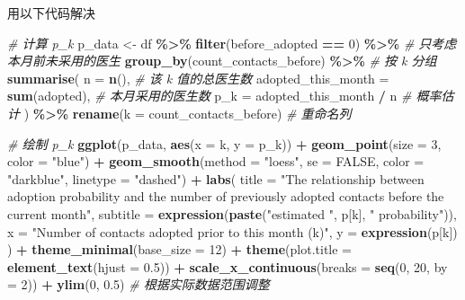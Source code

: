\documentclass[
]{article}
\newenvironment{Shaded}{\begin{snugshade}}{\end{snugshade}}
\newcommand{\AttributeTok}[1]{\textcolor[rgb]{0.13,0.29,0.53}{#1}}
\newcommand{\CommentTok}[1]{\textcolor[rgb]{0.56,0.35,0.01}{\textit{#1}}}
\newcommand{\ConstantTok}[1]{\textcolor[rgb]{0.56,0.35,0.01}{#1}}
\newcommand{\DecValTok}[1]{\textcolor[rgb]{0.00,0.00,0.81}{#1}}
\newcommand{\FloatTok}[1]{\textcolor[rgb]{0.00,0.00,0.81}{#1}}
\newcommand{\FunctionTok}[1]{\textcolor[rgb]{0.13,0.29,0.53}{\textbf{#1}}}
\newcommand{\NormalTok}[1]{#1}
\newcommand{\OtherTok}[1]{\textcolor[rgb]{0.56,0.35,0.01}{#1}}
\newcommand{\SpecialCharTok}[1]{\textcolor[rgb]{0.81,0.36,0.00}{\textbf{#1}}}
\newcommand{\StringTok}[1]{\textcolor[rgb]{0.31,0.60,0.02}{#1}}
\begin{document}
用以下代码解决

\begin{Shaded}
\begin{Highlighting}[]
\CommentTok{\# 计算 p\_k}
\NormalTok{p\_data }\OtherTok{\textless{}{-}}\NormalTok{ df }\SpecialCharTok{\%\textgreater{}\%}
  \FunctionTok{filter}\NormalTok{(before\_adopted }\SpecialCharTok{==} \DecValTok{0}\NormalTok{) }\SpecialCharTok{\%\textgreater{}\%}  \CommentTok{\# 只考虑本月前未采用的医生}
  \FunctionTok{group\_by}\NormalTok{(count\_contacts\_before) }\SpecialCharTok{\%\textgreater{}\%}  \CommentTok{\# 按 k 分组}
  \FunctionTok{summarise}\NormalTok{(}
    \AttributeTok{n =} \FunctionTok{n}\NormalTok{(),  }\CommentTok{\# 该 k 值的总医生数}
    \AttributeTok{adopted\_this\_month =} \FunctionTok{sum}\NormalTok{(adopted),  }\CommentTok{\# 本月采用的医生数}
    \AttributeTok{p\_k =}\NormalTok{ adopted\_this\_month }\SpecialCharTok{/}\NormalTok{ n  }\CommentTok{\# 概率估计}
\NormalTok{  ) }\SpecialCharTok{\%\textgreater{}\%}
  \FunctionTok{rename}\NormalTok{(}\AttributeTok{k =}\NormalTok{ count\_contacts\_before)  }\CommentTok{\# 重命名列}

\CommentTok{\# 绘制 p\_k}
\FunctionTok{ggplot}\NormalTok{(p\_data, }\FunctionTok{aes}\NormalTok{(}\AttributeTok{x =}\NormalTok{ k, }\AttributeTok{y =}\NormalTok{ p\_k)) }\SpecialCharTok{+}
  \FunctionTok{geom\_point}\NormalTok{(}\AttributeTok{size =} \DecValTok{3}\NormalTok{, }\AttributeTok{color =} \StringTok{"blue"}\NormalTok{) }\SpecialCharTok{+}
  \FunctionTok{geom\_smooth}\NormalTok{(}\AttributeTok{method =} \StringTok{"loess"}\NormalTok{, }\AttributeTok{se =} \ConstantTok{FALSE}\NormalTok{, }\AttributeTok{color =} \StringTok{"darkblue"}\NormalTok{, }\AttributeTok{linetype =} \StringTok{"dashed"}\NormalTok{) }\SpecialCharTok{+}
  \FunctionTok{labs}\NormalTok{(}
    \AttributeTok{title =} \StringTok{"The relationship between adoption probability and the number of previously adopted contacts before the current month"}\NormalTok{,}
    \AttributeTok{subtitle =} \FunctionTok{expression}\NormalTok{(}\FunctionTok{paste}\NormalTok{(}\StringTok{"estimated "}\NormalTok{, p[k], }\StringTok{" probability"}\NormalTok{)),}
    \AttributeTok{x =} \StringTok{"Number of contacts adopted prior to this month (k)"}\NormalTok{,}
    \AttributeTok{y =} \FunctionTok{expression}\NormalTok{(p[k])}
\NormalTok{  ) }\SpecialCharTok{+}
  \FunctionTok{theme\_minimal}\NormalTok{(}\AttributeTok{base\_size =} \DecValTok{12}\NormalTok{) }\SpecialCharTok{+}
  \FunctionTok{theme}\NormalTok{(}\AttributeTok{plot.title =} \FunctionTok{element\_text}\NormalTok{(}\AttributeTok{hjust =} \FloatTok{0.5}\NormalTok{)) }\SpecialCharTok{+}
  \FunctionTok{scale\_x\_continuous}\NormalTok{(}\AttributeTok{breaks =} \FunctionTok{seq}\NormalTok{(}\DecValTok{0}\NormalTok{, }\DecValTok{20}\NormalTok{, }\AttributeTok{by =} \DecValTok{2}\NormalTok{)) }\SpecialCharTok{+}
  \FunctionTok{ylim}\NormalTok{(}\DecValTok{0}\NormalTok{, }\FloatTok{0.5}\NormalTok{)  }\CommentTok{\# 根据实际数据范围调整}
\end{Highlighting}
\end{Shaded}
\end{document}

